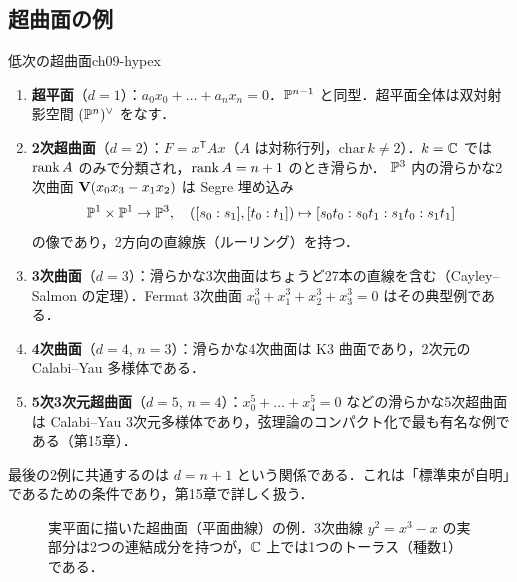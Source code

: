 \subsection{超曲面の例}

\begin{myex}{低次の超曲面}{ch09-hypex}
\begin{enumerate}
  \item \textbf{超平面}（$d=1$）：$a_0x_0+\dots+a_nx_n=0$．$\mathbb{P}^{n-1}$ と同型．超平面全体は双対射影空間 $(\mathbb{P}^n)^\vee$ をなす．
  \item \textbf{2次超曲面}（$d=2$）：$F=x^{\mathsf T}Ax$（$A$ は対称行列，$\mathrm{char}\,k\neq2$）．$k=\mathbb{C}$ では $\operatorname{rank} A$ のみで分類され，$\operatorname{rank} A=n+1$ のとき滑らか．
  $\mathbb{P}^3$ 内の滑らかな2次曲面 $\mathbf{V}(x_0x_3-x_1x_2)$ は Segre 埋め込み
  \[
    \mathbb{P}^1\times\mathbb{P}^1\to\mathbb{P}^3,\quad([s_0:s_1],[t_0:t_1])\mapsto[s_0t_0:s_0t_1:s_1t_0:s_1t_1]
  \]
  の像であり，2方向の直線族（ルーリング）を持つ．
  \item \textbf{3次曲面}（$d=3$）：滑らかな3次曲面はちょうど27本の直線を含む（Cayley--Salmon の定理）．Fermat 3次曲面 $x_0^3+x_1^3+x_2^3+x_3^3=0$ はその典型例である．
  \item \textbf{4次曲面}（$d=4$, $n=3$）：滑らかな4次曲面は K3 曲面であり，2次元の Calabi--Yau 多様体である．
  \item \textbf{5次3次元超曲面}（$d=5$, $n=4$）：$x_0^5+\dots+x_4^5=0$ などの滑らかな5次超曲面は Calabi--Yau 3次元多様体であり，弦理論のコンパクト化で最も有名な例である（第15章）．
\end{enumerate}
\end{myex}

最後の2例に共通するのは $d=n+1$ という関係である．これは「標準束が自明」であるための条件であり，第15章で詳しく扱う．

\begin{figure}[htbp]
\centering
{}
\caption{実平面に描いた超曲面（平面曲線）の例．3次曲線 $y^2=x^3-x$ の実部分は2つの連結成分を持つが，$\mathbb{C}$ 上では1つのトーラス（種数1）である．}
\label{fig:ch09-hypex}
\end{figure}

